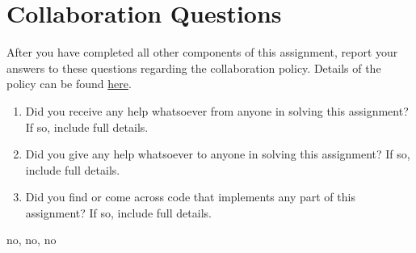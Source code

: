 \documentclass[11pt,addpoints,answers]{exam}
\newcommand{\sall}{\textbf{Select all that apply: }}
\begin{document}
\begin{questions}
\begin{parts}
    
    

    
\end{parts}\end{questions}

\newpage
\newpage
\section{Collaboration Questions}
After you have completed all other components of this assignment, report your answers to these questions regarding the collaboration policy. Details of the policy can be found \href{http://www.cs.cmu.edu/~mgormley/courses/10601/syllabus.html}{here}.
\begin{enumerate}
    \item Did you receive any help whatsoever from anyone in solving this assignment? If so, include full details.
    \item Did you give any help whatsoever to anyone in solving this assignment? If so, include full details.
    \item Did you find or come across code that implements any part of this assignment? If so, include full details.
\end{enumerate}

\begin{your_solution}[height=6cm]
no, no, no
\end{your_solution}
\end{document}

